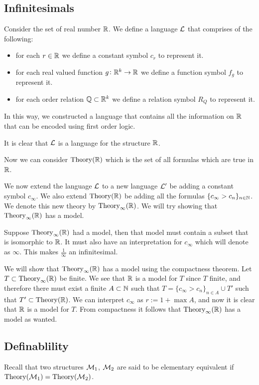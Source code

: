 \documentclass[11pt,a4paper]{article}
\begin{document}
\subsection{Infinitesimals}
Consider the set of real number $\mathbb{R}$.
We define a language $\mathcal{L}$ that comprises of the following:
\begin{itemize}
  \item for each $r \in \mathbb{R}$ we define a constant symbol $c_r$ to
    represent it.
  \item for each real valued function $g \colon \mathbb{R}^k \to \mathbb{R}$ we define
    a function symbol $f_g$ to represent it.
  \item for each order relation $\mathbb{Q} \subset \mathbb{R}^k$ we define a relation
    symbol $R_Q$ to represent it.
\end{itemize}

In this way, we constructed a language that contains all the information
on $\mathbb{R}$ that can be encoded using first order logic.

It is clear that $\mathcal{L}$ is a language for the structure $\mathbb{R}$.

Now we can consider $\operatorname{Theory}(\mathbb{R})$ which is the set of all formulas
which are true in $\mathbb{R}$.

We now extend the language $\mathcal{L}$ to a new language $\mathcal{L}'$ be adding
a constant symbol $c_\infty$. We also extend $\operatorname{Theory}(\mathbb{R})$ be adding
all the formulas $\{c_\infty > c_n\}_{n \in \mathbb{N}}$. We denote this
new theory by $\operatorname{Theory}_\infty(\mathbb{R})$. We will try showing that 
$\operatorname{Theory}_\infty(\mathbb{R})$ has a model.

Suppose $\operatorname{Theory}_\infty(\mathbb{R})$ had a model, then that model must contain
a subset that is isomorphic to $\mathbb{R}$.
It must also have an interpretation for $c_\infty$ which will denote 
as $\infty$.
This makes $\frac{1}{\infty}$ an infinitesimal.

We will show that $\operatorname{Theory}_\infty(\mathbb{R})$ has a model using the compactness
theorem.
Let $T \subset \operatorname{Theory}_\infty(\mathbb{R})$ be finite.
We see that $\mathbb{R}$ is a model for $T$ since $T$ finite,
and therefore there must exist a finite $A \subset \mathbb{N}$ such that
$T = \{c_\infty > c_n\}_{n \in A} \cup T'$ such that 
$T' \subset \operatorname{Theory}(\mathbb{R})$.
We can interpret $c_\infty$ as $r := 1 + \max A$, and now it is
clear that $\mathbb{R}$ is a model for $T$.
From compactness it follows that $\operatorname{Theory}_\infty(\mathbb{R})$ has a model
as wanted.

\subsection{Definablility}
Recall that two structures $\mathcal{M}_1$, $\mathcal{M}_2$ are said to be elementary 
equivalent if $\operatorname{Theory}(\mathcal{M}_1) = \operatorname{Theory}(\mathcal{M}_2)$.
\end{document}
